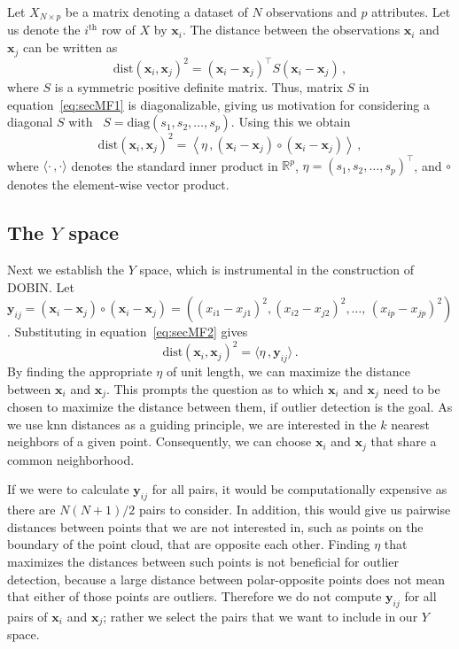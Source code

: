 \documentclass[letter,12pt]{article}
\newcommand{\dist}{\text{dist}}
\newcommand{\diag}{\text{diag}}
\begin{document}
Let $X_{N \times p}$ be a matrix denoting a dataset of $N$ observations and $p$ attributes. Let us denote the $i^{\text{th}}$ row of $X$ by $\bm{x}_i$. The distance between the observations $\bm{x}_i$ and $\bm{x}_j$ can be written as
\begin{equation}\label{eq:secMF1}
	\dist(\bm{x}_i, \bm{x}_j)^2 = ( \bm{x}_i - \bm{x}_j)^\top S ( \bm{x}_i - \bm{x}_j ) \, ,
\end{equation}
where $S$ is a symmetric positive definite matrix. {\color{blue} Thus, matrix $S$ in equation~\eqref{eq:secMF1} is diagonalizable, giving us motivation for considering a diagonal $S$ with } \ $S = \diag(s_1, s_2, \dots, s_p)$. Using this we obtain
\begin{equation}\label{eq:secMF2}
	\dist(\bm{x}_i, \bm{x}_j)^2 = \left\langle \eta\, , ( \bm{x}_i - \bm{x}_j )\circ ( \bm{x}_i - \bm{x}_j ) \right\rangle \,,
\end{equation}
where $\langle \cdot\, , \cdot \rangle$ denotes the standard inner product in $\mathbb{R}^p$, $\eta = (s_1, s_2, \dots, s_p)^\top$, and $\circ$ denotes the element-wise vector product. 



\subsection{The $Y$ space}\label{sec:MathFrame1}

Next we establish the $Y$ space, which is instrumental in the construction of DOBIN\@. Let $\bm{y}_{ij} = ( \bm{x}_i - \bm{x}_j )\circ ( \bm{x}_i - \bm{x}_j ) = \left( ( x_{i1} - x_{j1} )^2, ( x_{i2} - x_{j2} )^2, \dots, \, ( x_{ip} - x_{jp} )^2 \right)$. Substituting in equation~\eqref{eq:secMF2} gives
\begin{equation}\label{eq:secMF3}
	\dist(\bm{x}_i, \bm{x}_j)^2 = \langle \eta\, , \bm{y}_{ij} \rangle\, .
\end{equation}
By finding the appropriate $\eta$ of unit length, we can maximize the distance between $\bm{x}_i$ and $\bm{x}_j$. This prompts the question as to which $\bm{x}_i$ and $\bm{x}_j$ need to be chosen to maximize the distance between them, if outlier detection is the goal. As we use knn distances as a guiding principle, we are interested in the $k$ nearest neighbors of a given point. Consequently, we can choose $\bm{x}_i$ and $\bm{x}_j$ that share a common neighborhood.

If we were to calculate $\bm{y}_{ij}$ for all pairs, it would be computationally expensive as there are $N(N+1)/2$ pairs to consider. In addition, this would give us pairwise distances between points that we are not interested in, such as points on the boundary of the point cloud, that are opposite each other. Finding $\eta$ that maximizes the distances between such points is not beneficial for outlier detection, because a large distance between polar-opposite points does not mean that either of those points are outliers. Therefore we do not compute $\bm{y}_{ij}$ for all pairs of $\bm{x}_i$ and $\bm{x}_j$; rather we select the pairs that we want to include in our $Y$ space.
\end{document}
